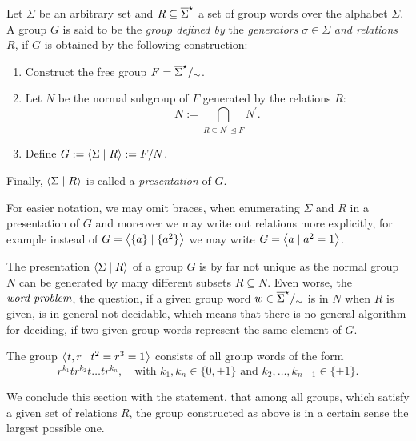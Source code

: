 \begin{definition}
\label{dfn_GrpConstructGenRel}
Let $\Sigma$ be an arbitrary set and $R \subseteq {\overline{\Sigma}}^{\star}$ a set of group words over the alphabet $\Sigma$. A group $G$ is said to be the \emph{group defined by} the \emph{generators} $\sigma \in \Sigma$ \emph{and relations} $R$, if $G$ is obtained by the following construction:
\begin{enumerate}
\item Construct the free group $F = {\overline{\Sigma}}^{\star}/_{\sim}$.
\item Let $N$ be the normal subgroup of $F$ generated by the relations $R$:
\begin{equation*}
N := \bigcap_{R \subseteq N^{\prime} \unlhd F} N^{\prime}.
\end{equation*}
\item Define $G := \left\langle \Sigma \mid R \right\rangle := F/N$.
\end{enumerate}
Finally, $\left\langle \Sigma \mid R \right\rangle$ is called a \emph{presentation} of $G$.

For easier notation, we may omit braces, when enumerating $\Sigma$ and $R$ in a presentation of $G$ and moreover we may write out relations more explicitly, for example instead of $G = \left\langle \{a\} \mid \{a^2\} \right\rangle$ we may write $G = \left\langle a \mid a^2 = 1 \right\rangle$.
\end{definition}

\begin{remark}
The presentation $\left\langle \Sigma \mid R \right\rangle$ of a group $G$ is by far not unique as the normal group $N$ can be generated by many different subsets $R \subseteq N$. Even worse, the $\emph{word problem}$, \ie the question, if a given group word $w \in {\overline{\Sigma}}^{\star}/_{\sim}$ is in $N$ when $R$ is given, is in general not decidable, which means that there is no general algorithm for deciding, if two given group words represent the same element of $G$.
\end{remark}

\begin{example}
The group $\left\langle t,r \mid t^2 = r^3 = 1 \right\rangle$ consists of all group words of the form
\begin{equation*}
\label{ex_RTGroup}
r^{k_1} t r^{k_2} t \dots t r^{k_n}, \quad 
\text {with } k_1, k_n \in \{0,\pm 1\} \text{ and } k_2, \dots, k_{n-1} \in \{\pm 1\}.
\end{equation*}
\end{example}
We conclude this section with the statement, that among all groups, which satisfy a given set of relations $R$, the group constructed as above is in a certain sense the largest possible one.

